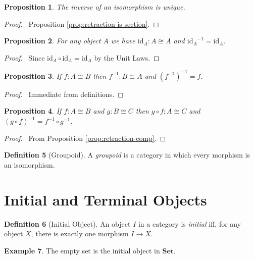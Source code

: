 \documentclass{book}
\let\qed\relax
\newtheorem{prop}{Proposition}[chapter]
\theoremstyle{definition}
\newtheorem{df}[prop]{Definition}
\newtheorem{ex}[prop]{Example}
\newcommand{\id}[1]{\ensuremath{\mathrm{id}_{#1}}}
\newcommand{\inv}[1]{\ensuremath{{#1}^{-1}}}
\newcommand{\Set}{\ensuremath{\mathbf{Set}}}
\begin{document}
\begin{prop}
    \label{prop:inv-unique}
    The inverse of an isomorphism is unique.
\end{prop}

\begin{proof}
    \pf\ Proposition \ref{prop:retraction-is-section}. \qed
\end{proof}

\begin{prop}
    For any object $A$ we have $\id{A} : A \cong A$ and $\id{A}^{-1} = \id{A}$.
\end{prop}

\begin{proof}
    \pf\ Since $\id{A} \circ \id{A} = \id{A}$ by the Unit Laws. \qed
\end{proof}

\begin{prop}
    If $f : A \cong B$ then $f^{-1} : B \cong A$ and $(f^{-1})^{-1} = f$.
\end{prop}

\begin{proof}
    \pf\ Immediate from definitions. \qed
\end{proof}

\begin{prop}
    If $f : A \cong B$ and $g : B \cong C$ then $g \circ f : A \cong C$ and $\inv{(g \circ f)} = \inv{f} \circ \inv{g}$.
\end{prop}

\begin{proof}
    \pf\ From Proposition \ref{prop:retraction-comp}. \qed
\end{proof}

\begin{df}[Groupoid]
    A \emph{groupoid} is a category in which every morphism is an isomorphism.
\end{df}

\section{Initial and Terminal Objects}

\begin{df}[Initial Object]
    An object $I$ in a category is \emph{initial} iff, for any object $X$, there is exactly one morphism $I \rightarrow X$.
\end{df}

\begin{ex}
    The empty set is the initial object in $\Set$.
\end{ex}
\end{document}
